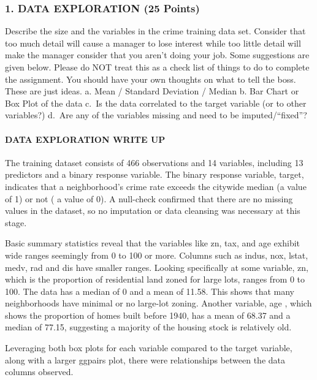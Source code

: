 \documentclass[
]{article}
\begin{document}
\subsubsection{1. DATA EXPLORATION (25
Points)}\label{data-exploration-25-points}

Describe the size and the variables in the crime training data set.
Consider that too much detail will cause a manager to lose interest
while too little detail will make the manager consider that you aren't
doing your job. Some suggestions are given below. Please do NOT treat
this as a check list of things to do to complete the assignment. You
should have your own thoughts on what to tell the boss. These are just
ideas. a. Mean / Standard Deviation / Median b. Bar Chart or Box Plot of
the data c.~Is the data correlated to the target variable (or to other
variables?) d.~Are any of the variables missing and need to be
imputed/``fixed''?

\paragraph{DATA EXPLORATION WRITE UP}\label{data-exploration-write-up}

The training dataset consists of 466 observations and 14 variables,
including 13 predictors and a binary response variable. The binary
response variable, target, indicates that a neighborhood's crime rate
exceeds the citywide median (a value of 1) or not ( a value of 0). A
null-check confirmed that there are no missing values in the dataset, so
no imputation or data cleansing was necessary at this stage.

Basic summary statistics reveal that the variables like zn, tax, and age
exhibit wide ranges seemingly from 0 to 100 or more. Columns such as
indus, nox, lstat, medv, rad and dis have smaller ranges. Looking
specifically at some variable, zn, which is the proportion of
residential land zoned for large lots, ranges from 0 to 100. The data
has a median of 0 and a mean of 11.58. This shows that many
neighborhoods have minimal or no large-lot zoning. Another variable, age
, which shows the proportion of homes built before 1940, has a mean of
68.37 and a median of 77.15, suggesting a majority of the housing stock
is relatively old.

Leveraging both box plots for each variable compared to the target
variable, along with a larger ggpairs plot, there were relationships
between the data columns observed.
\end{document}
